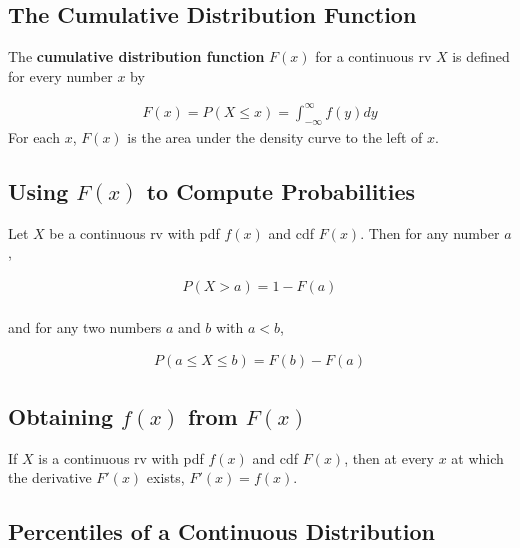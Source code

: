 \subsection{The Cumulative Distribution Function}

\begin{definition}
    The \textbf{cumulative distribution function} $F(x)$ for a continuous rv $X$ is defined for every number $x$ by

    \begin{align*}
        F(x) = P(X\leq x) = \int_{-\infty}^\infty f(y)dy
    \end{align*}
    For each $x$, $F(x)$ is the area under the density curve to the left of $x$.
\end{definition}

\subsection{Using $F(x)$ to Compute Probabilities}

\begin{proposition}
    Let $X$ be a continuous rv with pdf $f(x)$ and cdf $F(x)$. Then for any number $a$,

    \begin{align*}
        P(X>a) = 1-F(a) \\
    \end{align*}

    and for any two numbers $a$ and $b$ with $a<b$,

    \begin{align*}
        P(a\leq X\leq b) = F(b) - F(a)
    \end{align*}
\end{proposition}

\subsection{Obtaining $f(x)$ from $F(x)$}

\begin{proposition}
    If $X$ is a continuous rv with pdf $f(x)$ and cdf $F(x)$, then at every $x$ at which the derivative $F'(x)$ exists, $F'(x) = f(x)$.
\end{proposition}

\subsection{Percentiles of a Continuous Distribution}

